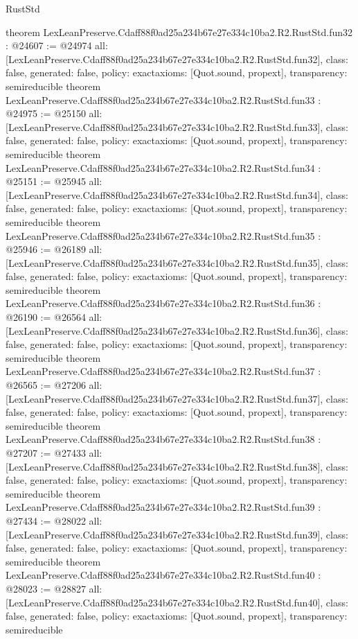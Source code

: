 \begin{lexlean}{RustStd}
\begin{coremodule}
{}
theorem LexLeanPreserve.Cdaff88f0ad25a234b67e27e334c10ba2.R2.RustStd.fun32 : @24607 := @24974 {
  all: [LexLeanPreserve.Cdaff88f0ad25a234b67e27e334c10ba2.R2.RustStd.fun32],
  class: false,
  generated: false,
  policy: exact{axioms: [Quot.sound, propext]},
  transparency: semireducible
}
theorem LexLeanPreserve.Cdaff88f0ad25a234b67e27e334c10ba2.R2.RustStd.fun33 : @24975 := @25150 {
  all: [LexLeanPreserve.Cdaff88f0ad25a234b67e27e334c10ba2.R2.RustStd.fun33],
  class: false,
  generated: false,
  policy: exact{axioms: [Quot.sound, propext]},
  transparency: semireducible
}
theorem LexLeanPreserve.Cdaff88f0ad25a234b67e27e334c10ba2.R2.RustStd.fun34 : @25151 := @25945 {
  all: [LexLeanPreserve.Cdaff88f0ad25a234b67e27e334c10ba2.R2.RustStd.fun34],
  class: false,
  generated: false,
  policy: exact{axioms: [Quot.sound, propext]},
  transparency: semireducible
}
theorem LexLeanPreserve.Cdaff88f0ad25a234b67e27e334c10ba2.R2.RustStd.fun35 : @25946 := @26189 {
  all: [LexLeanPreserve.Cdaff88f0ad25a234b67e27e334c10ba2.R2.RustStd.fun35],
  class: false,
  generated: false,
  policy: exact{axioms: [Quot.sound, propext]},
  transparency: semireducible
}
theorem LexLeanPreserve.Cdaff88f0ad25a234b67e27e334c10ba2.R2.RustStd.fun36 : @26190 := @26564 {
  all: [LexLeanPreserve.Cdaff88f0ad25a234b67e27e334c10ba2.R2.RustStd.fun36],
  class: false,
  generated: false,
  policy: exact{axioms: [Quot.sound, propext]},
  transparency: semireducible
}
theorem LexLeanPreserve.Cdaff88f0ad25a234b67e27e334c10ba2.R2.RustStd.fun37 : @26565 := @27206 {
  all: [LexLeanPreserve.Cdaff88f0ad25a234b67e27e334c10ba2.R2.RustStd.fun37],
  class: false,
  generated: false,
  policy: exact{axioms: [Quot.sound, propext]},
  transparency: semireducible
}
theorem LexLeanPreserve.Cdaff88f0ad25a234b67e27e334c10ba2.R2.RustStd.fun38 : @27207 := @27433 {
  all: [LexLeanPreserve.Cdaff88f0ad25a234b67e27e334c10ba2.R2.RustStd.fun38],
  class: false,
  generated: false,
  policy: exact{axioms: [Quot.sound, propext]},
  transparency: semireducible
}
theorem LexLeanPreserve.Cdaff88f0ad25a234b67e27e334c10ba2.R2.RustStd.fun39 : @27434 := @28022 {
  all: [LexLeanPreserve.Cdaff88f0ad25a234b67e27e334c10ba2.R2.RustStd.fun39],
  class: false,
  generated: false,
  policy: exact{axioms: [Quot.sound, propext]},
  transparency: semireducible
}
theorem LexLeanPreserve.Cdaff88f0ad25a234b67e27e334c10ba2.R2.RustStd.fun40 : @28023 := @28827 {
  all: [LexLeanPreserve.Cdaff88f0ad25a234b67e27e334c10ba2.R2.RustStd.fun40],
  class: false,
  generated: false,
  policy: exact{axioms: [Quot.sound, propext]},
  transparency: semireducible
}
\end{coremodule}
\end{lexlean}
